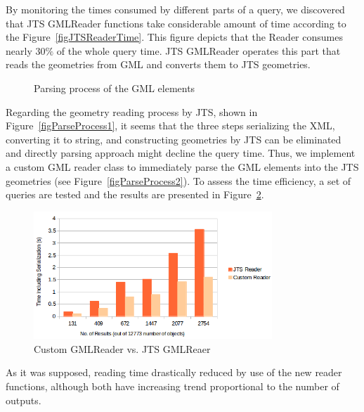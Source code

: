 \documentclass[a4paper,12pt]{article}
\begin{document}
By monitoring the times consumed by different parts of a query, we discovered that JTS GMLReader functions take considerable amount of time according to the Figure~\ref{figJTSReaderTime}. This figure depicts that the Reader consumes nearly $30\%$ of the whole query time. JTS GMLReader operates this part that reads the geometries from GML and converts them to JTS geometries. 
\begin{figure}
\centering
{}
\centering
{}
\caption{Parsing process of the GML elements}
\label{figParseProcess}
\end{figure}
Regarding the geometry reading process by JTS, shown in Figure~\ref{figParseProcess1}, it seems that the three steps serializing the XML, converting it to string, and constructing geometries by JTS can be eliminated and directly parsing approach might decline the query time. Thus, we implement a custom GML reader class to immediately parse the GML elements into the JTS geometries (see Figure~\ref{figParseProcess2}). To assess the time efficiency, a set of queries are tested and the results are presented in Figure~\ref{figGmlReader}. 
\begin{figure}
\centering
\includegraphics[width=0.8\textwidth]{GmlReader-2}
\caption{Custom GMLReader vs. JTS GMLReaer}
\label{figGmlReader}
\end{figure}
As it was supposed, reading time drastically reduced by use of the new reader functions, although both have increasing trend proportional to the number of outputs.%
\end{document}

